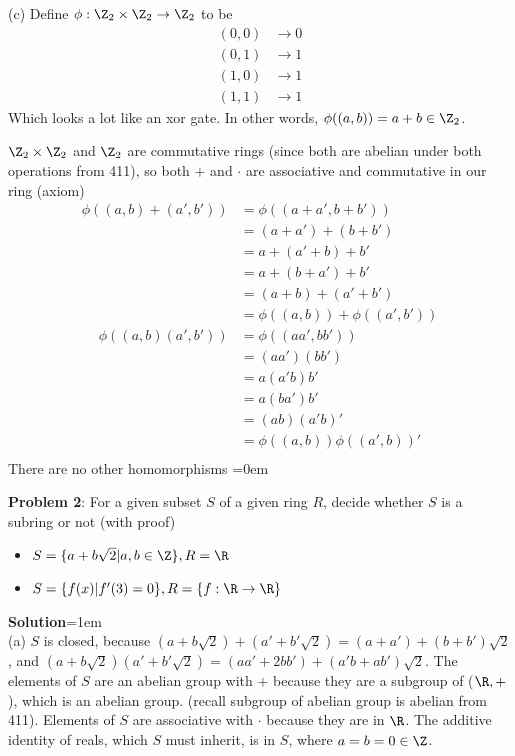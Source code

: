 \documentclass{article}
\begin{document}
(c) Define $\phi : \Z_2 \times \Z_2 \to \Z_2$ to be 
\begin{align*}
    (0, 0) &\to 0\\  
    (0, 1) &\to 1\\
    (1, 0) &\to 1\\
    (1, 1) &\to 1
\end{align*}
Which looks a lot like an xor gate. In other words, $\phi((a, b)) = a + b \in \Z_2$.

$\Z_2 \times \Z_2$ and $\Z_2$ are commutative rings (since both are abelian under both operations from 411), so both $+$ and $\cdot$ are associative and commutative in our ring (axiom)
\begin{align*}
    \phi((a, b) + (a', b')) &= \phi((a + a', b + b'))\\
    &= (a + a') + (b + b')\\
    &= a + (a' + b) + b'\\ 
    &= a + (b + a') + b'\\ 
    &= (a + b) + (a' + b')\\
    &= \phi((a, b)) + \phi((a', b'))
\end{align*}
\begin{align*}
    \phi((a, b)(a', b')) &= \phi((aa', bb'))\\
    &= (aa')(bb')\\
    &= a(a'b)b'\\
    &= a(ba')b'\\
    &= (ab)(a'b)'\\
    &= \phi((a,b))\phi((a',b))'\\
\end{align*}
There are no other homomorphisms
\newpage\parskip=0em
\begin{mdframed}[backgroundcolor=blue!20]
\textbf{Problem 2}: For a given subset $S$ of a given ring $R$, decide whether $S$ is a subring or not (with proof)
\begin{itemize}
    \item $S = \{ a + b\sqrt{2} | a, b \in\Z\}, R = \R$
    \item $S = \{ f(x) | f'(3) = 0\}, R = \{f : \R \to \R\}$
\end{itemize}
\end{mdframed}
\textbf{Solution}\parskip=1em\\
(a) $S$ is closed, because $(a + b\sqrt2) + (a' + b'\sqrt2) = (a + a') + (b+b')\sqrt2$, and $(a + b\sqrt2)(a' + b'\sqrt2) = (aa' + 2bb') + (a'b + ab')\sqrt2$. The elements of $S$ are an abelian group with $+$ because they are a subgroup of ($\R, +$), which is an abelian group. (recall subgroup of abelian group is abelian from 411). Elements of $S$ are associative with $\cdot$ because they are in $\R$. The additive identity of reals, which $S$ must inherit, is in $S$, where $a = b = 0 \in \Z$.
\end{document}
